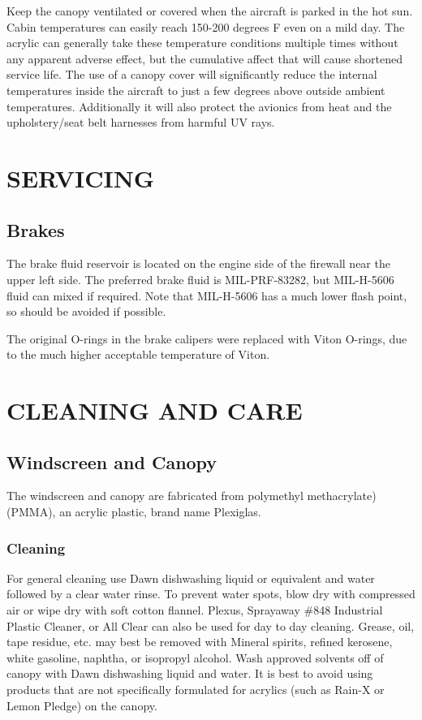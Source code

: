 Keep the canopy ventilated or covered when the aircraft is parked in the hot sun. Cabin temperatures can easily reach 150-200 degrees F even on a mild day. The acrylic can generally take these temperature conditions multiple times without any apparent adverse effect, but the cumulative affect that will cause shortened service life. The use of a canopy cover will significantly reduce the internal temperatures inside the aircraft to just a few degrees above outside ambient temperatures. Additionally it will also protect the avionics from heat and the upholstery/seat belt harnesses from harmful UV rays.

\section{SERVICING}
\subsection{Brakes}
The brake fluid reservoir is located on the engine side of the firewall near the upper left side.  The preferred brake fluid is MIL-PRF-83282, but MIL-H-5606 fluid can mixed if required.  Note that MIL-H-5606 has a much lower flash point, so should be avoided if possible.

The original O-rings in the brake calipers were replaced with Viton O-rings, due to the much higher acceptable temperature of Viton.

\section{CLEANING AND CARE}
\subsection{Windscreen and Canopy}
The windscreen and canopy are fabricated from polymethyl methacrylate) (PMMA), an acrylic plastic, brand name Plexiglas.

\subsubsection{Cleaning}
For general cleaning use Dawn dishwashing liquid or equivalent and water followed by a clear water rinse. To prevent water spots, blow dry with compressed air or wipe dry with soft cotton flannel. Plexus, Sprayaway \#848 Industrial Plastic Cleaner, or All Clear can also be used for day to day cleaning. Grease, oil, tape residue, etc. may best be removed with Mineral spirits, refined kerosene, white gasoline, naphtha, or isopropyl alcohol. Wash approved solvents off of canopy with Dawn dishwashing liquid and water. It is best to avoid using products that are not specifically formulated for acrylics (such as Rain-X or Lemon Pledge) on the canopy.

